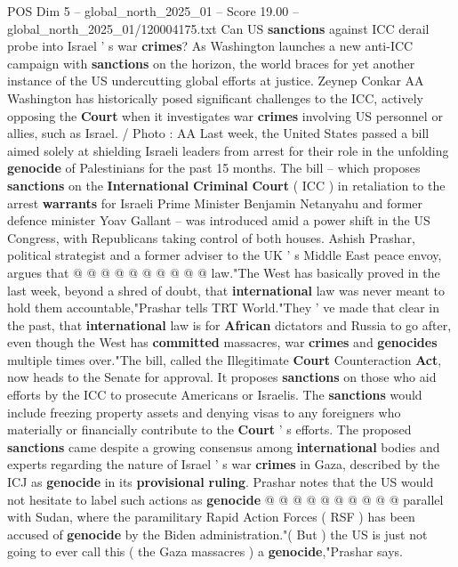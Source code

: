 \begin{textsample}{POS Dim 5 – global\_north\_2025\_01 – Score 19.00 – global\_north\_2025\_01/120004175.txt}  \label{ex:f5_pos_263}
Can US \textbf{sanctions} against ICC derail probe into Israel ' s war \textbf{crimes}?
As Washington launches a new anti-ICC campaign with \textbf{sanctions} on the horizon, the world braces for yet another instance of the US undercutting global efforts at justice.
Zeynep Conkar AA Washington has historically posed significant challenges to the ICC, actively opposing the \textbf{Court} when it investigates war \textbf{crimes} involving US personnel or allies, such as Israel. / Photo : AA Last week, the United States passed a bill aimed solely at shielding Israeli leaders from arrest for their role in the unfolding \textbf{genocide} of Palestinians for the past 15 months.
The bill -- which proposes \textbf{sanctions} on the \textbf{International} \textbf{Criminal} \textbf{Court} ( ICC ) in retaliation to the arrest \textbf{warrants} for Israeli Prime Minister Benjamin Netanyahu and former defence minister Yoav Gallant -- was introduced amid a power shift in the US Congress, with Republicans taking control of both houses.
Ashish Prashar, political strategist and a former adviser to the UK ' s Middle East peace envoy, argues that @ @ @ @ @ @ @ @ @ @ law."The West has basically proved in the last week, beyond a shred of doubt, that \textbf{international} law was never meant to hold them accountable,"Prashar tells TRT World."They ' ve made that clear in the past, that \textbf{international} law is for \textbf{African} dictators and Russia to go after, even though the West has \textbf{committed} massacres, war \textbf{crimes} and \textbf{genocides} multiple times over."The bill, called the Illegitimate \textbf{Court} Counteraction \textbf{Act}, now heads to the Senate for approval.
It proposes \textbf{sanctions} on those who aid efforts by the ICC to prosecute Americans or Israelis.
The \textbf{sanctions} would include freezing property assets and denying visas to any foreigners who materially or financially contribute to the \textbf{Court} ' s efforts.
The proposed \textbf{sanctions} came despite a growing consensus among \textbf{international} bodies and experts regarding the nature of Israel ' s war \textbf{crimes} in Gaza, described by the ICJ as \textbf{genocide} in its \textbf{provisional} \textbf{ruling}.
Prashar notes that the US would not hesitate to label such actions as \textbf{genocide} @ @ @ @ @ @ @ @ @ @ parallel with Sudan, where the paramilitary Rapid Action Forces ( RSF ) has been accused of \textbf{genocide} by the Biden administration."( But ) the US is just not going to ever call this ( the Gaza massacres ) a \textbf{genocide},"Prashar says.

\end{textsample}

